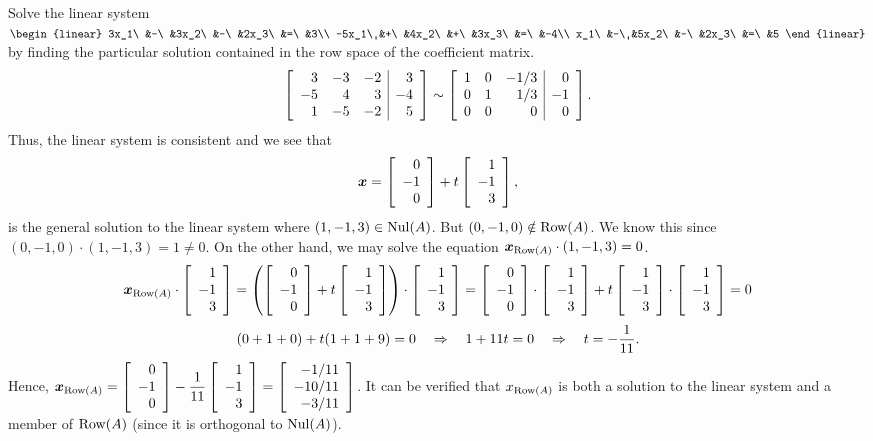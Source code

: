 \begin{Exam} Solve the linear system $\begin{linear} 3x_1\ &-\ &3x_2\ &-\ &2x_3\ &=\ &3\\ -5x_1\ &+\ &4x_2\ &+\ &3x_3\ &=\ &-4\\ x_1\ &-\ &5x_2\ &-\ &2x_3\ &=\ &5 \end{linear}$ by finding the particular solution contained in the row space of the coefficient matrix.
\[\mtx{rrr|r}{3&-3&-2&3\\-5&4&3&-4\\1&-5&-2&5} \sim \mtx{rrr|r}{1&0&-1/3&0\\0&1&1/3&-1\\ 0&0&0&0}.\] Thus, the linear system is consistent and we see that 
\[\bb x = \vr{0\\-1\\0} + t\vr{1\\-1\\3},\] is the general solution to the linear system where $(1,-1,3)\in \nul(A)$. But $(0,-1,0) \notin \row(A)$. We know this since $(0,-1,0)\cdot (1,-1,3) = 1\neq 0$. On the other hand, we may solve the equation $\bb x_{\row(A)} \cdot (1,-1,3) = 0$. 
\[\bb x_{\row(A)} \cdot \vr{1\\-1\\3} =  \left(\vr{0\\-1\\0} + t\vr{1\\-1\\3}\right) \cdot \vr{1\\-1\\3} = \vr{0\\-1\\0}\cdot \vr{1\\-1\\3} + t\vr{1\\-1\\3}\cdot \vr{1\\-1\\3} = 0\]
\[(0+1+0) + t(1+1+9) = 0 \qRightarrow 1 + 11t = 0 \qRightarrow t = -\dfrac{1}{11}.\] Hence, $\bb x_{\row(A)} = \vr{0\\-1\\0} -\dfrac{1}{11}\vr{1\\-1\\3} = \vr{-1/11 \\ -10/11 \\ -3/11}$. It can be verified that $x_{\row(A)}$ is both a solution to the linear system and a member of $\row(A)$ (since it is orthogonal to $\nul(A)$).
\end{Exam}


